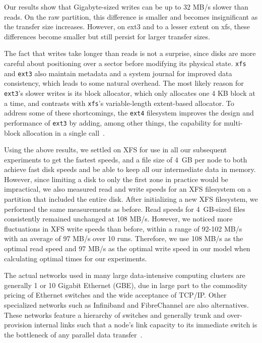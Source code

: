 

Our results show that Gigabyte-sized writes can be up to 32 MB/s
slower than reads.  On the raw partition, this difference is smaller
and becomes insignificant as the transfer size increases.  However, on
ext3 and to a lesser extent on xfs, these differences become smaller
but still persist for larger transfer sizes.

The fact that writes take longer than reads is not a surprise, since
disks are more careful about positioning over a sector before
modifying its physical state.  \texttt{xfs} and \texttt{ext3} also
maintain metadata and a system journal for improved data consistency,
which leads to some natural overhead.  The most likely reason for
\texttt{ext3}'s slower writes is its block allocator, which only
allocates one 4 KB block at a time, and contrasts with \texttt{xfs}'s
variable-length extent-based allocator.  To address some of these
shortcomings, the \texttt{ext4} filesystem improves the design and
performance of \texttt{ext3} by adding, among other things, the
capability for multi-block allocation in a single call~\cite{Kumar08}.

Using the above results, we settled on XFS for use in all our
subsequent experiments to get the fastest speeds, and a file size of
4~GB per node to both achieve fast disk speeds and be able to keep all
our intermediate data in memory. However, since limiting a disk to
only the first zone in practice would be impractical, we also measured
read and write speeds for an XFS filesystem on a partition that
included the entire disk.  After initializing a new XFS filesystem, we
performed the same measurements as before.  Read speeds for 4~GB-sized
files consistently remained unchanged at 108 MB/s.  However, we
noticed more fluctuations in XFS write speeds than before, within a
range of 92-102 MB/s with an average of 97 MB/s over 10 runs.
Therefore, we use 108 MB/s as the optimal read speed and 97 MB/s as
the optimal write speed in our model when calculating optimal times
for our experiments.

 The actual networks used in many
large data-intensive computing clusters are generally 1 or 10 Gigabit
Ethernet (GBE), due in large part to the commodity pricing of Ethernet
switches and the wide acceptance of TCP/IP.  Other specialized
networks such as Infiniband and FibreChannel are also alternatives.
These networks feature a hierarchy of switches and generally trunk and
over-provision internal links such that a node's link capacity to its
immediate switch is the bottleneck of any parallel data
transfer~\cite{Grider06, Leiserson85}.

